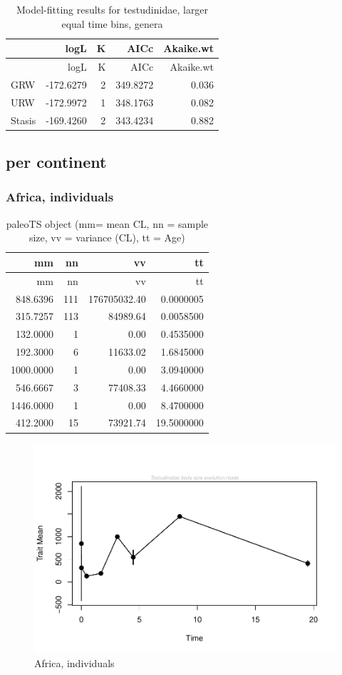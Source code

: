\documentclass[]{article}
\begin{document}
\begin{longtable}[]{@{}lrrrr@{}}
\caption{Model-fitting results for testudinidae, larger equal time bins,
genera}\tabularnewline
\toprule
& logL & K & AICc & Akaike.wt\tabularnewline
\midrule
\endfirsthead
\toprule
& logL & K & AICc & Akaike.wt\tabularnewline
\midrule
\endhead
GRW & -172.6279 & 2 & 349.8272 & 0.036\tabularnewline
URW & -172.9972 & 1 & 348.1763 & 0.082\tabularnewline
Stasis & -169.4260 & 2 & 343.4234 & 0.882\tabularnewline
\bottomrule
\end{longtable}

\newpage

\subsection{per continent}\label{per-continent}

\subsubsection{Africa, individuals}\label{africa-individuals}

\begin{longtable}[]{@{}rrrr@{}}
\caption{paleoTS object (mm= mean CL, nn = sample size, vv = variance
(CL), tt = Age)}\tabularnewline
\toprule
mm & nn & vv & tt\tabularnewline
\midrule
\endfirsthead
\toprule
mm & nn & vv & tt\tabularnewline
\midrule
\endhead
848.6396 & 111 & 176705032.40 & 0.0000005\tabularnewline
315.7257 & 113 & 84989.64 & 0.0058500\tabularnewline
132.0000 & 1 & 0.00 & 0.4535000\tabularnewline
192.3000 & 6 & 11633.02 & 1.6845000\tabularnewline
1000.0000 & 1 & 0.00 & 3.0940000\tabularnewline
546.6667 & 3 & 77408.33 & 4.4660000\tabularnewline
1446.0000 & 1 & 0.00 & 8.4700000\tabularnewline
412.2000 & 15 & 73921.74 & 19.5000000\tabularnewline
\bottomrule
\end{longtable}

\begin{figure}[htbp]
\centering
\includegraphics{MA_JJ_files/figure-latex/paleoTS, individuals, Africa-1.pdf}
\caption{Africa, individuals}
\end{figure}
\end{document}
